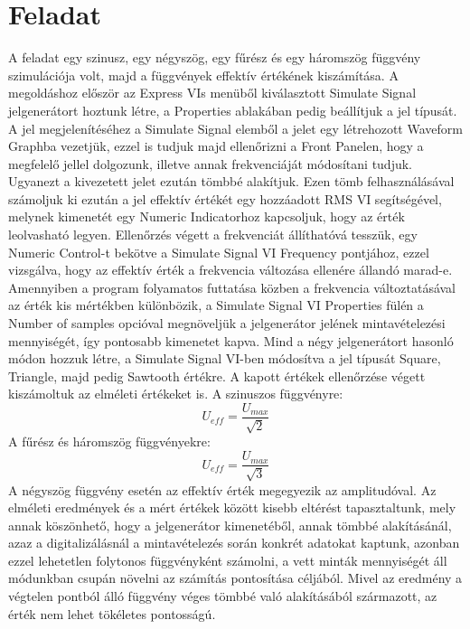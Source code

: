 \documentclass[10pt, conference,a4paper]{ITKproc}
\begin{document}
\section{Feladat}
A feladat egy szinusz, egy négyszög, egy fűrész és egy háromszög függvény szimulációja volt, majd a függvények effektív értékének kiszámítása. A megoldáshoz először az Express VIs menüből kiválasztott Simulate Signal jelgenerátort hoztunk létre, a Properties ablakában pedig beállítjuk a jel típusát. A jel megjelenítéséhez a Simulate Signal elemből a jelet egy létrehozott Waveform Graphba vezetjük, ezzel is tudjuk majd ellenőrizni a Front Panelen, hogy a megfelelő jellel dolgozunk, illetve annak frekvenciáját módosítani tudjuk. Ugyanezt a kivezetett jelet ezután tömbbé alakítjuk. Ezen tömb felhasználásával számoljuk ki ezután a jel effektív értékét egy hozzáadott RMS VI segítségével, melynek kimenetét egy Numeric Indicatorhoz kapcsoljuk, hogy az érték leolvasható legyen. Ellenőrzés végett a frekvenciát állíthatóvá tesszük, egy Numeric Control-t bekötve a Simulate Signal VI Frequency pontjához, ezzel vizsgálva, hogy az effektív érték a frekvencia változása ellenére állandó marad-e. Amennyiben a program folyamatos futtatása közben a frekvencia változtatásával az érték kis mértékben különbözik, a Simulate Signal VI Properties fülén a Number of samples opcióval megnöveljük a jelgenerátor jelének mintavételezési mennyiségét, így pontosabb kimenetet kapva. Mind a négy jelgenerátort hasonló módon hozzuk létre, a Simulate Signal VI-ben módosítva a jel típusát Square, Triangle, majd pedig Sawtooth értékre. 
A kapott értékek ellenőrzése végett kiszámoltuk az elméleti értékeket is. A szinuszos függvényre: 
\[U_{eff} = \frac{U_{max}}{\sqrt{2}}\]
A fűrész és háromszög függvényekre:
\[U_{eff} = \frac{U_{max}}{\sqrt{3}} \]
A négyszög függvény esetén az effektív érték megegyezik az amplitudóval. Az elméleti eredmények és a mért értékek között kisebb eltérést tapasztaltunk, mely annak köszönhető, hogy a jelgenerátor kimenetéből, annak tömbbé alakításánál, azaz a digitalizálásnál a mintavételezés során konkrét adatokat kaptunk, azonban ezzel lehetetlen folytonos függvényként számolni, a vett minták mennyiségét áll módunkban csupán növelni az számítás pontosítása céljából. Mivel az eredmény a végtelen pontból álló függvény véges tömbbé való alakításából származott, az érték nem lehet tökéletes pontosságú. 
\end{document}
